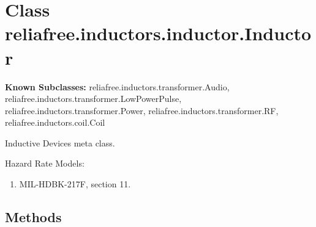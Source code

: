 %
%
%


\section{Class reliafree.inductors.inductor.Inductor}

    \label{reliafree:inductors:inductor:Inductor}
\textbf{Known Subclasses:}
reliafree.inductors.transformer.Audio,
    reliafree.inductors.transformer.LowPowerPulse,
    reliafree.inductors.transformer.Power,
    reliafree.inductors.transformer.RF,
    reliafree.inductors.coil.Coil

Inductive Devices meta class.

Hazard Rate Models:

\begin{enumerate}

\setlength{\parskip}{0.5ex}
  \item MIL-HDBK-217F, section 11.

\end{enumerate}



  \subsection{Methods}

    \label{reliafree:inductors:inductor:Inductor:__init__}

    \vspace{0.5ex}

